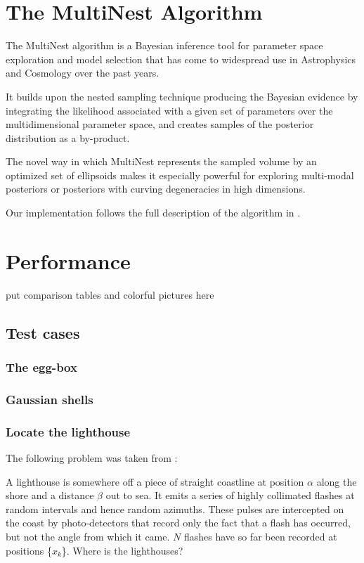 \documentclass{article}
\begin{document}
\section{The MultiNest Algorithm}
The MultiNest algorithm is a Bayesian inference tool for parameter space exploration and model selection that has come to widespread use in Astrophysics and Cosmology over the past years. 

It builds upon the nested sampling technique producing the Bayesian evidence by integrating the likelihood associated with a given set of parameters over the multidimensional parameter space, and creates samples of the posterior distribution as a by-product.

The novel way in which MultiNest represents the sampled volume by an optimized set of ellipsoids makes it especially powerful for exploring multi-modal posteriors or posteriors with curving degeneracies in high dimensions.

Our implementation follows the full description of the algorithm in \cite{2009MNRAS.398.1601F}.
\section{Performance}
put comparison tables and colorful pictures here

\subsection{Test cases}

\subsubsection{The egg-box}

\subsubsection{Gaussian shells}

\subsubsection{Locate the lighthouse}

The following problem was taken from \cite{Siv2006}:

\vspace{0.2cm}

\begin{adjustwidth*}{1.2cm}{2.cm}
A lighthouse is somewhere off a piece of straight coastline at position $\alpha$ along the shore and a distance $\beta$ out to sea. It emits a series of highly collimated flashes at random intervals and hence random azimuths. These pulses are intercepted on the coast by photo-detectors that record only the fact that a flash has occurred, but not the angle from which it came. $N$ flashes have so far been recorded at positions \{$x_k$\}. Where is the lighthouses?
 \end{adjustwidth*}
 
\end{document}
